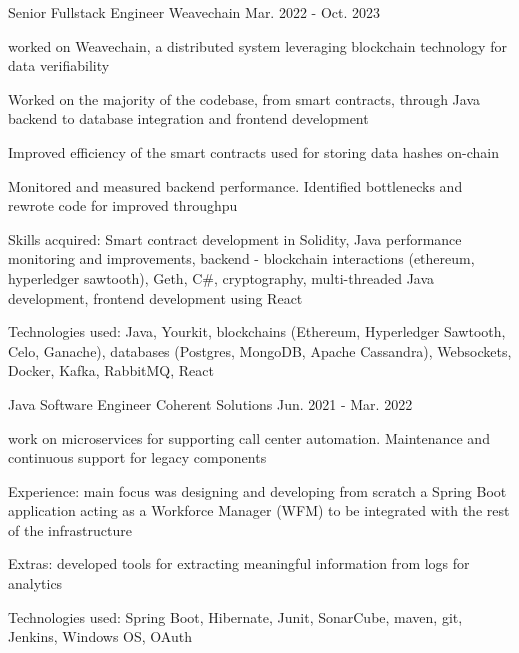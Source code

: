 \begin{cventries}
  \cventry
    {Senior Fullstack Engineer} %
    {Weavechain} %
    {} %
    {Mar. 2022 - Oct. 2023} %
    {
      \begin{cvitems} %
        \item {worked on Weavechain, a distributed system leveraging blockchain technology for data verifiability}
        \item {Worked on the majority of the codebase, from smart contracts, through Java backend to database integration and frontend development}
        \item {Improved efficiency of the smart contracts used for storing data hashes on-chain}
        \item {Monitored and measured backend performance. Identified bottlenecks and rewrote code for improved throughpu}
        \item {Skills acquired: Smart contract development in Solidity, Java performance monitoring and improvements, backend - blockchain interactions (ethereum, hyperledger sawtooth), Geth, C\#, cryptography, multi-threaded Java development, frontend development using React}
        \item {Technologies used: Java, Yourkit, blockchains (Ethereum, Hyperledger Sawtooth, Celo, Ganache), databases (Postgres, MongoDB, Apache Cassandra), Websockets, Docker, Kafka, RabbitMQ, React}
      \end{cvitems}
    }

\cventry
    {Java Software Engineer} %
    {Coherent Solutions} %
    {} %
    {Jun. 2021 - Mar. 2022} %
    {
      \begin{cvitems} %
        \item {work on microservices for supporting call center automation. Maintenance and continuous support for legacy components}
        \item {Experience: main focus was designing and developing from scratch a Spring Boot application acting as a Workforce Manager (WFM) to be integrated with the rest of the infrastructure}
        \item {Extras: developed tools for extracting meaningful information from logs for analytics}
        \item {Technologies used: Spring Boot, Hibernate, Junit, SonarCube, maven, git, Jenkins, Windows OS, OAuth}
      \end{cvitems}
    }


\end{cventries}

